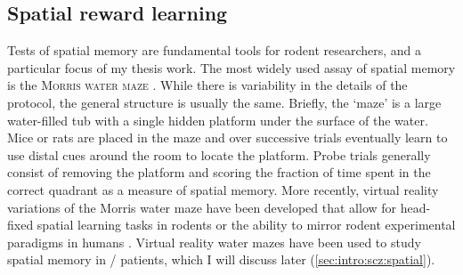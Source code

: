 \subsection{Spatial reward learning}
\label{sec:intro:memory:spatial-reward}
Tests of spatial memory are fundamental tools for rodent researchers, and a particular focus of my thesis work.
The most widely used assay of spatial memory is the \textsc{Morris water maze} \citep{Morris1984}.
While there is variability in the details of the protocol, the general structure is usually the same.
Briefly, the `maze' is a large water-filled tub with a single hidden platform under the surface of the water.
Mice or rats are placed in the maze and over successive trials eventually learn to use distal cues around the room to locate the platform.
Probe trials generally consist of removing the platform and scoring the fraction of time spent in the correct quadrant as a measure of spatial memory.
More recently, virtual reality variations of the Morris water maze have been developed that allow for head-fixed spatial learning tasks in rodents \citep{Aronov2014} or the ability to mirror rodent experimental paradigms in humans \citep{Astur1998}.
Virtual reality water mazes have been used to study spatial memory in \scz/ patients, which I will discuss later (\autoref{sec:intro:scz:spatial}).

